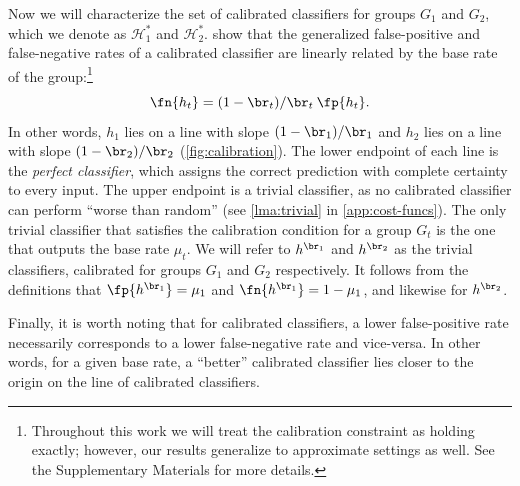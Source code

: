 Now we will characterize the set of calibrated classifiers for groups $G_1$ and $G_2$, which
we denote as $\mathcal{H}^*_1$ and $\mathcal{H}^*_2$.
\citeauthor{kleinberg2016inherent} show that the generalized false-positive and
false-negative rates of a calibrated classifier are
linearly related by the base rate of the group:\footnote{
  Throughout this work we will treat the calibration constraint as holding
  exactly; however, our results generalize to approximate settings as well. See the
  Supplementary Materials for more details.
}
%
\begin{equation}
  \fn{h_t} = (1 - \br_t) / \br_t \: \fp{h_t}.
\end{equation}
%
In other words, $h_1$ lies on
a line with slope $(1 - \br_1) / \br_1$ and
$h_2$ lies on a line with slope $(1 - \br_2) / \br_2$ (\autoref{fig:calibration}).
The lower endpoint of each line is the \emph{perfect classifier}, which
assigns the correct prediction with complete certainty to every input.
The upper endpoint is a trivial classifier, as no calibrated classifier
can perform ``worse than random'' (see \autoref{lma:trivial} in
\autoref{app:cost-funcs}).
The only trivial classifier that satisfies the calibration
condition for a group $G_t$ is the one that outputs the base rate $\mu_t$.
We will refer to $h^{\br_1}$ and $h^{\br_2}$ as the trivial classifiers,
calibrated for groups $G_1$ and $G_2$ respectively.
It follows from the definitions that $\fp{h^{\br_1}} = \mu_1$
and $\fn{h^{\br_1}} = 1 - \mu_1$, and likewise for $h^{\br_2}$.

Finally, it is worth noting that for calibrated classifiers,
a lower false-positive rate necessarily corresponds to a lower false-negative rate
and vice-versa.
In other words, for a given base rate, a ``better'' calibrated classifier
lies closer to the origin on the line of calibrated classifiers.


